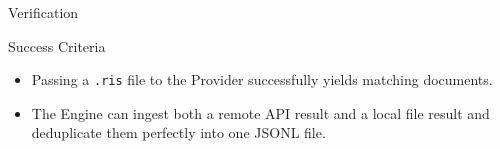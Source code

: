 \documentclass[aspectratio=169]{beamer}
\begin{document}
\begin{frame}{Verification}
  \begin{alertblock}{Success Criteria}
    \begin{itemize}
        \item Passing a \texttt{.ris} file to the Provider successfully yields matching documents.
        \item The Engine can ingest both a remote API result and a local file result and deduplicate them perfectly into one JSONL file.
    \end{itemize}
  \end{alertblock}
\end{frame}
\end{document}
